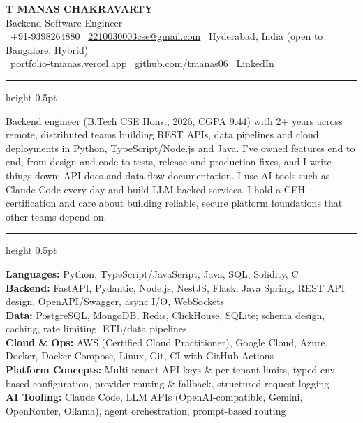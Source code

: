 \documentclass[11pt,a4paper]{article}
\newcommand{\cvsection}[1]{%
  \vspace{6pt}%
  \noindent{\large\textbf{\MakeUppercase{#1}}}%
  \vspace{2pt}%
  \hrule height 0.5pt%
  \vspace{4pt}%
}
\begin{document}
\begin{center}
  {\Huge \textbf{T MANAS CHAKRAVARTY}} \\[3pt]
  {\large Backend Software Engineer} \\[5pt]
  \small
  \faPhone*\ +91-9398264880 \quad \textbar \quad
  \faEnvelope\ \href{mailto:2210030003cse@gmail.com}{2210030003cse@gmail.com} \quad \textbar \quad
  \faMapMarker*\ Hyderabad, India (open to Bangalore, Hybrid) \\[3pt]
  \faGlobe\ \href{https://portfolio-tmanas.vercel.app}{portfolio-tmanas.vercel.app} \quad \textbar \quad
  \faGithub\ \href{https://github.com/tmanas06}{github.com/tmanas06} \quad \textbar \quad
  \faLinkedin\ \href{https://linkedin.com/in/t-manas-chakravarty-91958224b}{LinkedIn}
\end{center}

\cvsection{Summary}
\noindent Backend engineer (B.Tech CSE Hons., 2026, CGPA 9.44) with 2+ years across remote, distributed teams building REST APIs,
data pipelines and cloud deployments in Python, TypeScript/Node.js and Java. I've owned features end to end, from design and code to tests,
release and production fixes, and I write things down: API docs and data-flow documentation. I use AI tools such as Claude Code every day
and build LLM-backed services. I hold a CEH certification and care about building reliable, secure platform foundations that other teams depend on.

\cvsection{Technical Skills}
\noindent\textbf{Languages:} Python, TypeScript/JavaScript, Java, SQL, Solidity, C \\
\textbf{Backend:} FastAPI, Pydantic, Node.js, NestJS, Flask, Java Spring, REST API design, OpenAPI/Swagger, async I/O, WebSockets \\
\textbf{Data:} PostgreSQL, MongoDB, Redis, ClickHouse, SQLite; schema design, caching, rate limiting, ETL/data pipelines \\
\textbf{Cloud \& Ops:} AWS (Certified Cloud Practitioner), Google Cloud, Azure, Docker, Docker Compose, Linux, Git, CI with GitHub Actions \\
\textbf{Platform Concepts:} Multi-tenant API keys \& per-tenant limits, typed env-based configuration, provider routing \& fallback, structured request logging \\
\textbf{AI Tooling:} Claude Code, LLM APIs (OpenAI-compatible, Gemini, OpenRouter, Ollama), agent orchestration, prompt-based routing
\end{document}
